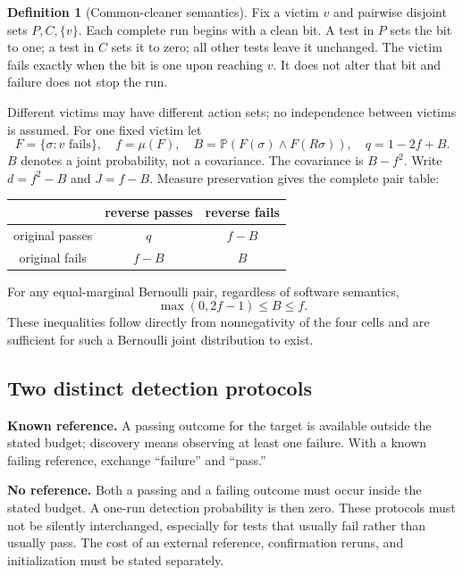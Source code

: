 \documentclass[11pt,a4paper]{article}
\theoremstyle{definition}\newtheorem{definition}[theorem]{Definition}
\theoremstyle{remark}\newtheorem{remark}[theorem]{Remark}
\newcommand{\Prb}{\mathbb P}
\theoremstyle{definition}\newtheorem{xexample}[xtheorem]{Example}\theoremstyle{plain}
\begin{document}
\begin{definition}[Common-cleaner semantics]
Fix a victim $v$ and pairwise disjoint sets $P,C,\{v\}$. Each complete run begins with a clean bit. A test in $P$ sets the bit to one; a test in $C$ sets it to zero; all other tests leave it unchanged. The victim fails exactly when the bit is one upon reaching $v$. It does not alter that bit and failure does not stop the run.
\end{definition}
Different victims may have different action sets; no independence between victims is assumed. For one fixed victim let
\[
 F=\{\sigma:v\text{ fails}\},\quad f=\mu(F),\quad
 B=\Prb(F(\sigma)\land F(R\sigma)),\quad q=1-2f+B.
\]
$B$ denotes a joint probability, not a covariance. The covariance is $B-f^2$. Write $d=f^2-B$ and $J=f-B$. Measure preservation gives the complete pair table:
\begin{center}
\begin{tabular}{c|cc}
 & reverse passes & reverse fails\\\hline
original passes & $q$ & $f-B$\\
original fails & $f-B$ & $B$
\end{tabular}
\end{center}
For any equal-marginal Bernoulli pair, regardless of software semantics,
\begin{equation}\label{eq:frechet}
 \max(0,2f-1)\le B\le f.
\end{equation}
These inequalities follow directly from nonnegativity of the four cells and are sufficient for such a Bernoulli joint distribution to exist.

\subsection{Two distinct detection protocols}
\textbf{Known reference.} A passing outcome for the target is available outside the stated budget; discovery means observing at least one failure. With a known failing reference, exchange ``failure'' and ``pass.''

\textbf{No reference.} Both a passing and a failing outcome must occur inside the stated budget. A one-run detection probability is then zero. These protocols must not be silently interchanged, especially for tests that usually fail rather than usually pass. The cost of an external reference, confirmation reruns, and initialization must be stated separately.
\end{document}
